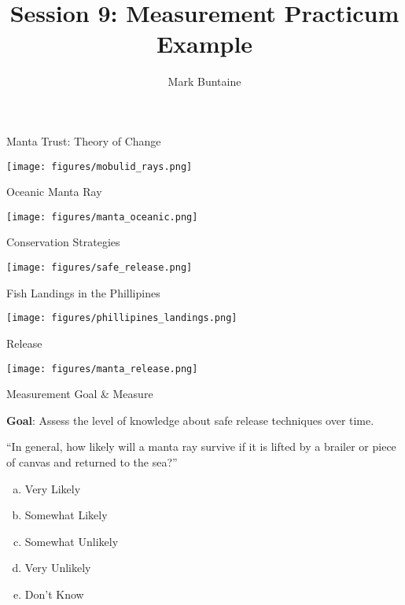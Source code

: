 \documentclass[ignorenonframetext,]{beamer}
\title{Session 9: Measurement Practicum Example}
\author{Mark Buntaine}
\date{}
\providecommand{\tightlist}{%
  \setlength{\itemsep}{0pt}\setlength{\parskip}{0pt}}
\begin{document}
\frame{\titlepage}

\begin{frame}{Manta Trust: Theory of Change}
\protect\hypertarget{manta-trust-theory-of-change}{}

\texttt{[image: figures/mobulid\_rays.png]}

\end{frame}

\begin{frame}{Oceanic Manta Ray}
\protect\hypertarget{oceanic-manta-ray}{}

\texttt{[image: figures/manta\_oceanic.png]}

\end{frame}

\begin{frame}{Conservation Strategies}
\protect\hypertarget{conservation-strategies}{}

\texttt{[image: figures/safe\_release.png]}

\end{frame}

\begin{frame}{Fish Landings in the Phillipines}
\protect\hypertarget{fish-landings-in-the-phillipines}{}

\texttt{[image: figures/phillipines\_landings.png]}

\end{frame}

\begin{frame}{Release}
\protect\hypertarget{release}{}

\texttt{[image: figures/manta\_release.png]}

\end{frame}

\begin{frame}{Measurement Goal \& Measure}
\protect\hypertarget{measurement-goal-measure}{}

\textbf{Goal}: Assess the level of knowledge about safe release
techniques over time.

``In general, how likely will a manta ray survive if it is lifted by a
brailer or piece of canvas and returned to the sea?''

\begin{enumerate}
[a.]
\tightlist
\item
  Very Likely
\item
  Somewhat Likely
\item
  Somewhat Unlikely
\item
  Very Unlikely
\item
  Don't Know
\end{enumerate}

\end{frame}
\end{document}
